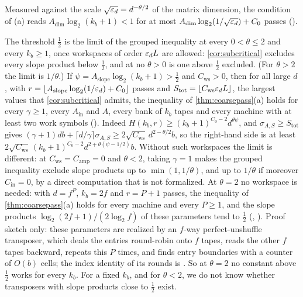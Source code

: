 Measured against the scale $\sqrt{\varepsilon_d}=d^{-\theta/2}$ of the matrix dimension, the condition of (a) reads $A_{\mathrm{dim}}\log_2(k_b+1)<1$
for at most $A_{\mathrm{dim}}\log_2(1/\sqrt{\varepsilon_d})+C_0$ passes ().

The threshold $\frac12$ is the limit of the grouped inequality at every $0<\theta\le2$ and every $k_b\ge1$, once workspaces of order
$\varepsilon_dL$ are allowed: \cref{cor:subcritical} excludes every slope product below $\frac12$, and at no $\theta>0$ is one above $\frac12$
excluded. (For $\theta>2$ the limit is $1/\theta$.) If $\psi=A_{\mathrm{slope}}\log_2(k_b+1)>\frac12$ and $C_{\mathrm{ws}}>0$, then for all large $d$, with
$r=\lfloor A_{\mathrm{slope}}\log_2(1/\varepsilon_d)+C_0\rfloor$ passes and $S_{\mathrm{tot}}=\lfloor C_{\mathrm{ws}}\varepsilon_dL\rfloor$, the largest values
that \cref{cor:subcritical} admits, the inequality of \cref{thm:coarsepass}(a) holds for every $\gamma\ge1$, every $A_{\mathrm{in}}$ and $A$,
every bank of $k_b$ tapes and every machine with at least two work symbols (). Indeed
$H(k_b,r)\ge(k_b+1)^{C_0-2}d^{\theta\psi}$, and $\sigma_{A,S}\ge S_{\mathrm{tot}}$ gives
$(\gamma+1)db+\lceil d/\gamma\rceil\sigma_{A,S}\ge2\sqrt{C_{\mathrm{ws}}}\,d^{2-\theta/2}b$, so the right-hand side is at least
$2\sqrt{C_{\mathrm{ws}}}\,(k_b+1)^{C_0-2}d^{2+\theta(\psi-1/2)}b$. Without such workspaces the limit is different: at $C_{\mathrm{ws}}=C_{\mathrm{amp}}=0$
and $\theta<2$, taking $\gamma=1$ makes the grouped inequality exclude slope products up to $\min(1,1/\theta)$, and up to $1/\theta$
if moreover $C_{\mathrm{in}}=0$, by a direct computation that is not formalized. At $\theta=2$ no workspace is
needed: with $d=f^P$, $k_b=2f$ and $r=P+1$ passes, the inequality of \cref{thm:coarsepass}(a) holds for every machine and every $P\ge1$,
and the slope products $\log_2(2f+1)/(2\log_2f)$ of these parameters tend to $\frac12$ (,
). Proof sketch only: these parameters are realized by an $f$-way perfect-unshuffle
transposer, which deals the entries round-robin onto $f$ tapes, reads the other $f$ tapes backward, repeats this $P$ times, and finds entry
boundaries with a counter of $O(b)$ cells; the index identity of its rounds is . So at $\theta=2$ no
constant above $\frac12$ works for every $k_b$. For a fixed $k_b$, and for $\theta<2$, we do not know whether transposers with slope products
close to $\frac12$ exist.

